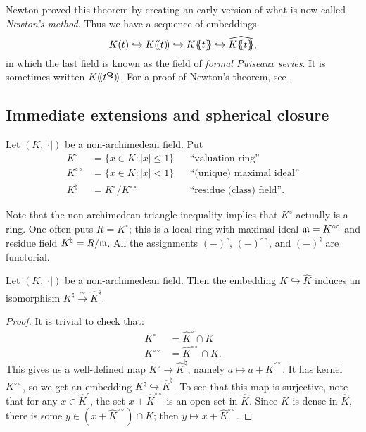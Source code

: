 Newton proved this theorem by creating an early version of what is now called 
\emph{Newton's method}. Thus we have a sequence of embeddings 
\[
  K(t)\hookrightarrow 
  K\laurent{t} \hookrightarrow 
  K\puiseaux{t} \hookrightarrow 
  \widehat{K{\puiseaux{t}}} ,
\]
in which the last field is known as the field of \emph{formal Puiseaux 
series}. It is sometimes written $K(\!( t^{\mathbf{Q}})\!)$. For a proof of Newton's 
theorem, see \cite[Cor.~13.15]{eisenbud-1995}. 


\subsection{Immediate extensions and spherical closure}

\begin{definition}
Let $(K,|\cdot|)$ be a non-archimedean field. Put 
\begin{align*}
  K^\circ &= \{x\in K\colon |x|\leqslant 1\} && \text{``valuation ring''} \\
  K^{\circ\circ} &= \{x\in K\colon |x|<1\} && \text{``(unique) maximal ideal''} \\
  K^\natural &= K^\circ / K^{\circ\circ} && \text{``residue (class) field''} .
\end{align*}
\end{definition}

Note that the non-archimedean triangle inequality implies that 
$K^\circ$ actually is a ring. One often puts $R=K^\circ$; this is a local ring 
with maximal ideal $\mathfrak{m}=K^{\circ\circ}$ and residue field $K^\natural=R/\mathfrak{m}$. 
All the assignments $(-)^\circ$, $(-)^{\circ\circ}$, and $(-)^\natural$ are 
functorial. 

\begin{lemma}
Let $(K,|\cdot|)$ be a non-archimedean field. Then the embedding 
$K\hookrightarrow \widehat K$ induces an isomorphism 
$K^\natural\xrightarrow\sim\widehat K^\natural$.
\end{lemma}
\begin{proof}
It is trivial to check that: 
\begin{align*}
  K^\circ &= \widehat K^\circ\cap K \\
  K^{\circ\circ} &= \widehat K^{\circ\circ}\cap K .
\end{align*}
This gives us a well-defined map $K^\circ\to \widehat K^\natural$, namely 
$a\mapsto a+\widehat K^{\circ\circ}$. It has kernel $K^{\circ\circ}$, so we get 
an embedding $K^\natural\hookrightarrow \widehat K^\natural$. To see that this 
map is surjective, note that for any $x\in \widehat K^\circ$, the set 
$x+\widehat K^{\circ\circ}$ is an open set in $\widehat K$. Since $K$ is dense 
in $\widehat K$, there is some $y\in (x+\widehat K^{\circ\circ})\cap K$; then 
$y\mapsto x+\widehat K^{\circ\circ}$. 
\end{proof}


